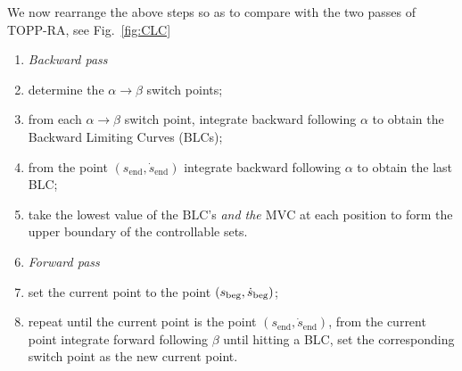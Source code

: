 \documentclass[journal]{IEEEtran}
\theoremstyle{plain}
\theoremstyle{definition}
\theoremstyle{definition}
\newcommand{\rmend}{\mathrm{end}}
\newcommand{\MVC}{\mathrm{MVC}}
\newcommand{\BLC}{\mathrm{BLC}}
\begin{document}
We now rearrange the above steps so as to compare with the two passes
of TOPP-RA, see Fig.~\ref{fig:CLC}
\begin{enumerate}
\item [] \emph{Backward pass}
\item [$1$)] determine the  $\alpha\rightarrow\beta$ switch points;
\item [${2a}$)] from each $\alpha\rightarrow\beta$ switch point, integrate
  backward following $\alpha$ to obtain the Backward Limiting Curves ($\BLC$s);
\item [${2b}$)] from the point $(s_{\rmend}, \dot s_{\rmend})$
  integrate backward following $\alpha$ to obtain the last BLC;
\item [$3$)] take the lowest value of the $\BLC$'s \emph{and the $\MVC$} at each
  position to form the upper boundary of the controllable sets.
\item [] \emph{Forward pass}
\item [$4a$)]set the current point to the point $(s_{\rm{beg}}, \dot s_{\rm{beg}})$;
\item [$4b$)] repeat until the current point is the point
  $(s_{\rmend}, \dot s_{\rmend})$, from the current point integrate
  forward following $\beta$ until hitting a BLC, set the corresponding
  switch point as the new current point.
\end{enumerate}
\end{document}
